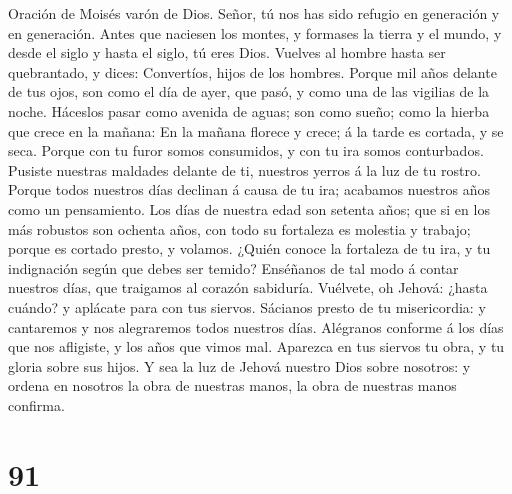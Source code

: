  Oración de Moisés varón de Dios. Señor, tú nos has sido
refugio en generación y en generación.  Antes que naciesen
los montes, y formases la tierra y el mundo, y desde el siglo y hasta el
siglo, tú eres Dios.  Vuelves al hombre hasta ser
quebrantado, y dices: Convertíos, hijos de los hombres. 
Porque mil años delante de tus ojos, son como el día de ayer, que pasó,
y como una de las vigilias de la noche.  Háceslos pasar
como avenida de aguas; son como sueño; como la hierba que crece en la
mañana:  En la mañana florece y crece; á la tarde es
cortada, y se seca.  Porque con tu furor somos consumidos,
y con tu ira somos conturbados.  Pusiste nuestras maldades
delante de ti, nuestros yerros á la luz de tu rostro. 
Porque todos nuestros días declinan á causa de tu ira; acabamos nuestros
años como un pensamiento.  Los días de nuestra edad son
setenta años; que si en los más robustos son ochenta años, con todo su
fortaleza es molestia y trabajo; porque es cortado presto, y volamos.
 ¿Quién conoce la fortaleza de tu ira, y tu indignación
según que debes ser temido?  Enséñanos de tal modo á
contar nuestros días, que traigamos al corazón sabiduría.
 Vuélvete, oh Jehová: ¿hasta cuándo? y aplácate para con
tus siervos.  Sácianos presto de tu misericordia: y
cantaremos y nos alegraremos todos nuestros días. 
Alégranos conforme á los días que nos afligiste, y los años que vimos
mal.  Aparezca en tus siervos tu obra, y tu gloria sobre
sus hijos.  Y sea la luz de Jehová nuestro Dios sobre
nosotros: y ordena en nosotros la obra de nuestras manos, la obra de
nuestras manos confirma.

\hypertarget{section-90}{%
\section{91}\label{section-90}}

